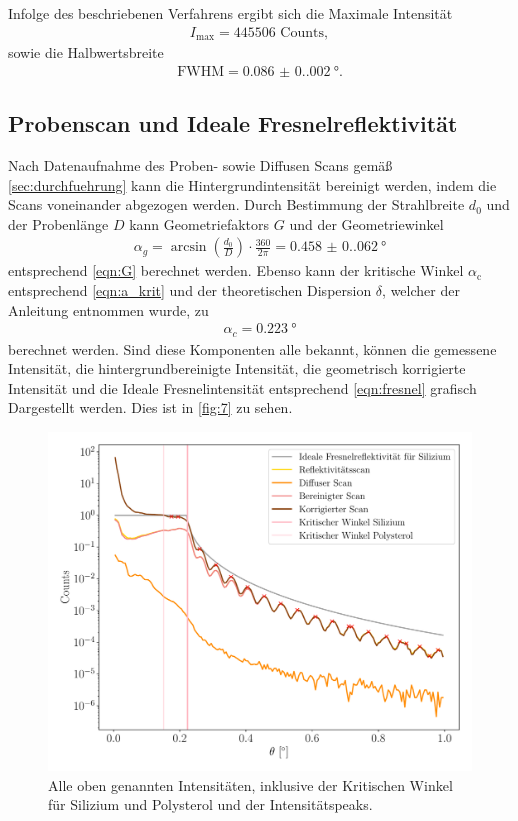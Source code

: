 \documentclass[12pt]{article}
\begin{document}
Infolge des beschriebenen Verfahrens ergibt sich die Maximale Intensität 
\begin{align*}
  I_{\text{max}} = 445506\text{ Counts},
\end{align*}
sowie die Halbwertsbreite
\begin{align*}
  \text{FWHM} = \SI{0.086(0.002)}{\degree}\text{.}
\end{align*}
\subsection{Probenscan und Ideale Fresnelreflektivität}
Nach Datenaufnahme des Proben- sowie Diffusen Scans gemäß \autoref{sec:durchfuehrung} kann die Hintergrundintensität bereinigt werden, indem die Scans voneinander abgezogen werden.
Durch Bestimmung der Strahlbreite $d_0$ und der Probenlänge $D$ kann Geometriefaktors $G$
und der Geometriewinkel
\begin{align*}
  \alpha_g=\arcsin\left(\frac{d_0}{D}\right) \cdot \frac{360}{2 \pi}=\SI{0.458(0.062)}{\degree}
\end{align*}
entsprechend \autoref{eqn:G} berechnet werden.
Ebenso kann der kritische Winkel $\alpha_\text{c}$ entsprechend \autoref{eqn:a_krit} und der theoretischen Dispersion $\delta$, welcher der Anleitung entnommen wurde, zu
\begin{align*}
  \alpha_c=\SI{0.223}{\degree}
\end{align*}
berechnet werden.
Sind diese Komponenten alle bekannt, können die gemessene Intensität, die hintergrundbereinigte Intensität, die geometrisch korrigierte Intensität und die Ideale Fresnelintensität entsprechend \autoref{eqn:fresnel} grafisch Dargestellt werden.
Dies ist in \autoref{fig:7} zu sehen.
\begin{figure}[H]
  \centering
  \includegraphics[scale=0.6]{Ressourcen/probe.pdf}
  \caption{Alle oben genannten Intensitäten, inklusive der Kritischen Winkel für Silizium und Polysterol und der Intensitätspeaks.}\label{fig:7}
\end{figure}
\end{document}
